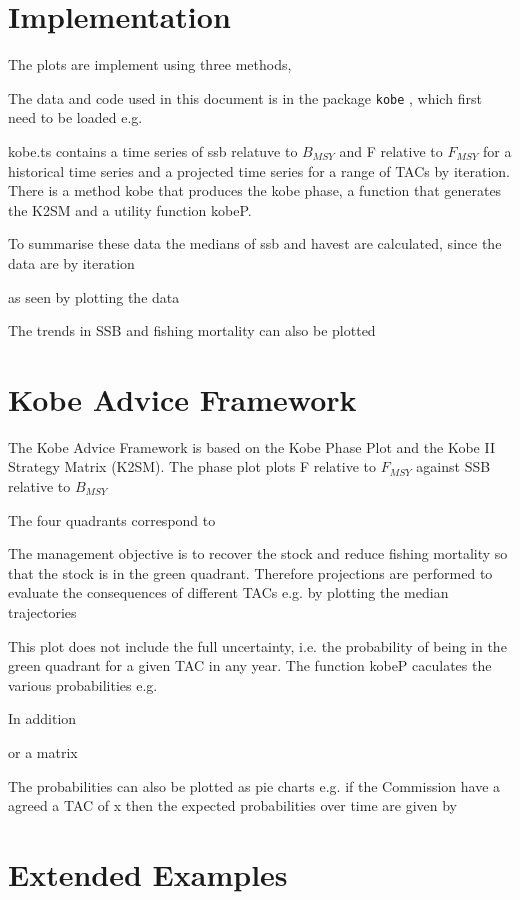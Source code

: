 \documentclass[a4paper, 11pt, oldtoc]{artikel1}
\begin{document}
\section{Implementation}



The plots are implement using three methods, 

The data and code used in this document is in the package {\tt kobe} , which first need to be loaded e.g.


kobe.ts contains a time series of ssb relatuve to $B_{MSY}$ and F relative to $F_{MSY}$ for a historical time series and a projected time series for a range of TACs by iteration.
There is a method kobe that produces the kobe phase, a function that generates the K2SM and a utility function kobeP.

To summarise these data the medians of ssb and havest are calculated, since the data are by iteration

as seen by plotting the data



The trends in SSB and fishing mortality can also be plotted


\section*{Kobe Advice Framework}

The Kobe Advice Framework is based on the Kobe Phase Plot and the Kobe II Strategy Matrix (K2SM). 
The phase plot plots F relative to $F_{MSY}$ against SSB relative to $B_{MSY}$


The four quadrants correspond to

The management objective is to recover the stock and reduce fishing mortality so that the stock is in the green quadrant. Therefore
projections are performed to evaluate the consequences of different TACs e.g. by plotting the median trajectories

This plot does not include the full uncertainty, i.e. the probability of being in the green quadrant for a given TAC in any year.
The function kobeP caculates the various probabilities e.g. 

In addition 


or a matrix


The probabilities can also be plotted as pie charts e.g. if the Commission have a agreed a TAC of x then the expected probabilities over time are given by


\section*{Extended Examples}
\end{document}
